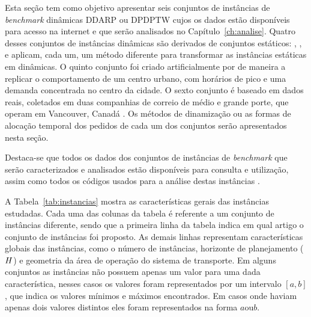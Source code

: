 Esta seção tem como objetivo apresentar seis conjuntos de instâncias de 
\textit{benchmark} dinâmicas DDARP ou DPDPTW cujos os dados estão disponíveis 
para acesso na internet \cite{pankratz_benchmark_2009} e que
serão analisados no Capítulo~\ref{ch:analise}.
Quatro desses conjuntos de instâncias dinâmicas são derivados de conjuntos 
estáticos: 
\textcite{berbeglia_hybrid_tabu_2012},
\textcite{pureza_laporte_waiting_2008}, 
\textcite{pankratz_dynamic_2005}
e \textcite{fabri_dynamic_2006}
aplicam, cada um, um método diferente para transformar as
instâncias estáticas em dinâmicas.
O quinto conjunto foi criado artificialmente por 
\textcite{gendreau_neighborhood_2006} de maneira a replicar o comportamento de 
um centro urbano, com horários de pico e uma demanda concentrada no centro da 
cidade.
O sexto conjunto é baseado em dados reais, coletados em duas companhias 
de correio de médio e grande porte, que operam em Vancouver, Canadá 
\cite{mitrovic-minic_waiting_2004}.
Os métodos de dinamização ou as formas de alocação temporal dos pedidos de cada
um dos conjuntos serão apresentados nesta seção.

Destaca-se que todos os dados dos conjuntos de instâncias de \textit{benchmark}
que serão caracterizados e analisados estão disponíveis para consulta e
utilização, assim como todos os códigos usados para a análise destas
instâncias \cite{eccel_problemas_2019}.

A Tabela~\ref{tab:instancias} mostra as características gerais das instâncias
estudadas.
Cada uma das colunas da tabela é referente a um conjunto de
instâncias diferente, sendo que a primeira linha da tabela indica em qual
artigo o conjunto de instâncias foi proposto.
As demais linhas representam características globais das instâncias, como o
número de instâncias, horizonte de planejamento ($H$) e geometria
da área de operação do sistema de transporte.
Em alguns conjuntos as instâncias não possuem apenas um valor para uma dada 
característica, nesses casos os valores foram representados por um 
intervalo $[a, b]$, que indica os valores mínimos e máximos encontrados.
Em casos onde haviam apenas dois valores distintos eles foram representados na
forma $a \text{ou} b$.


